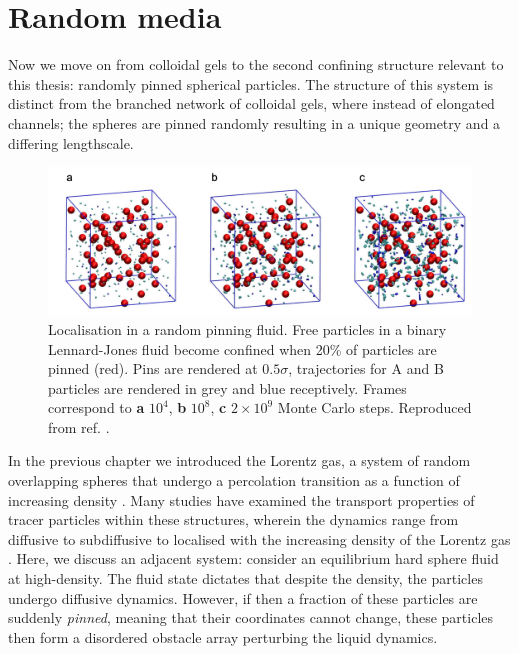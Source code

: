 \section{Random media}
\label{section:confinement}


Now we move on from colloidal gels to the second confining structure relevant to this thesis: randomly pinned spherical particles. The structure of this system is distinct from the branched network of colloidal gels, where instead of elongated channels; the spheres are pinned randomly resulting in a unique geometry and a differing lengthscale.

\begin{figure}
	\includegraphics[width=\linewidth]{chapters/colloids/figsColloids/figPinning_TJ.png}
	\caption[Localisation in a random pinning fluid.]{Localisation in a random pinning fluid. Free particles in a binary Lennard-Jones fluid become confined when 20\% of particles are pinned (red). Pins are rendered at $0.5\sigma$, trajectories for A and B particles are rendered in grey and blue receptively. Frames correspond to \textbf{a} $10^4$, \textbf{b} $10^8$, \textbf{c} $2\times 10^9$ Monte Carlo steps. Reproduced from ref. \cite{ozawa2018}.}
	\label{fig:Pinning_TJ}
\end{figure}

In the previous chapter we introduced the Lorentz gas, a system of random overlapping spheres that undergo a percolation transition as a function of increasing density \cite{vanbeijeren1982}. Many studies have examined the transport properties of tracer particles within these structures, wherein the dynamics range from diffusive to subdiffusive to localised with the increasing density of the Lorentz gas \cite{dettmann2014, machta1983}. Here, we discuss an adjacent system: consider an equilibrium hard sphere fluid at high-density. The fluid state dictates that despite the density, the particles undergo diffusive dynamics. However, if then a fraction of these particles are suddenly \textit{pinned}, meaning that their coordinates cannot change, these particles then form a disordered obstacle array perturbing the liquid dynamics.

